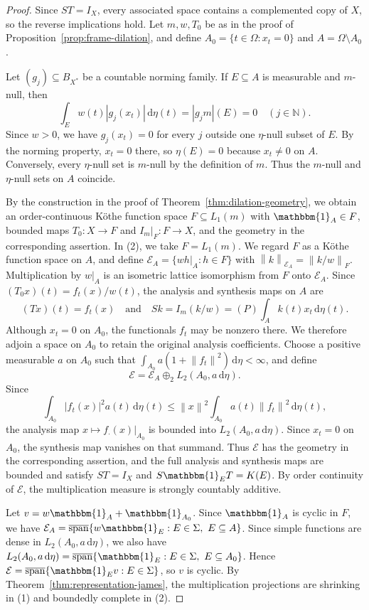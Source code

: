 \documentclass[11pt,leqno]{amsart}
\theoremstyle{compact}
\numberwithin{equation}{section}
\theoremstyle{compactremark}
\theoremstyle{compact}
\def\cspan{\overline{\operatorname{span}}}
\newcommand{\1}{\mathbbm{1}}
\newcommand{\rmd}{\mathrm{d}}
\newcommand{\N}{\mathbb{N}}
\newcommand{\norm}[1]{\left\|#1\right\|}
\newcommand{\abs}[1]{\left|#1\right|}
\begin{document}
\begin{proof}
\begingroup
Since $ST=I_X$, every associated space contains a complemented copy of $X$, so the reverse implications hold. Let $m,w,T_0$ be as in the proof of Proposition~\ref{prop:frame-dilation}, and define $A_0=\{t\in\Omega:x_t=0\}$ and $A=\Omega\setminus A_0$.

Let $(g_j)\subseteq B_{X^*}$ be a countable norming family. If $E\subseteq A$ is measurable and $m$-null, then
\[
\int_Ew(t)\abs{g_j(x_t)}\,\rmd\eta(t)=\abs{g_jm}(E)=0\quad(j\in\N).
\]
Since $w>0$, we have $g_j(x_t)=0$ for every $j$ outside one $\eta$-null subset of $E$. By the norming property, $x_t=0$ there, so $\eta(E)=0$ because $x_t\neq0$ on $A$. Conversely, every $\eta$-null set is $m$-null by the definition of $m$. Thus the $m$-null and $\eta$-null sets on $A$ coincide.

By the construction in the proof of Theorem~\ref{thm:dilation-geometry}, we obtain an order-continuous K\"othe function space $F\subseteq L_1(m)$ with $\1_A\in F$, bounded maps $T_0\colon X\to F$ and $I_m|_F\colon F\to X$, and the geometry in the corresponding assertion. In (2), we take $F=L_1(m)$. We regard $F$ as a K\"othe function space on $A$, and define $\mathcal E_A=\{wh|_A:h\in F\}$ with $\norm{k}_{\mathcal E_A}=\norm{k/w}_F$. Multiplication by $w|_A$ is an isometric lattice isomorphism from $F$ onto $\mathcal E_A$. Since $(T_0x)(t)=f_t(x)/w(t)$, the analysis and synthesis maps on $A$ are
\[
(Tx)(t)=f_t(x)\quad\text{and}\quad Sk=I_m(k/w)=(P)\!\int_Ak(t)x_t\,\rmd\eta(t).
\]
Although $x_t=0$ on $A_0$, the functionals $f_t$ may be nonzero there. We therefore adjoin a space on $A_0$ to retain the original analysis coefficients. Choose a positive measurable $a$ on $A_0$ such that $\int_{A_0}a(1+\norm{f_t}^2)\,\rmd\eta<\infty$, and define
\[
\mathcal E=\mathcal E_A\oplus_2 L_2(A_0,a\,\rmd\eta).
\]
Since
\[
\int_{A_0}\abs{f_t(x)}^2a(t)\,\rmd\eta(t)\leq\norm{x}^2\int_{A_0}a(t)\norm{f_t}^2\,\rmd\eta(t),
\]
the analysis map $x\mapsto f_\cdot(x)|_{A_0}$ is bounded into $L_2(A_0,a\,\rmd\eta)$. Since $x_t=0$ on $A_0$, the synthesis map vanishes on that summand. Thus $\mathcal E$ has the geometry in the corresponding assertion, and the full analysis and synthesis maps are bounded and satisfy $ST=I_X$ and $S\1_ET=K(E)$. By order continuity of $\mathcal E$, the multiplication measure is strongly countably additive.

Let $v=w\1_A+\1_{A_0}$. Since $\1_A$ is cyclic in $F$, we have $\mathcal E_A=\cspan\{w\1_E:E\in\Sigma,\ E\subseteq A\}$. Since simple functions are dense in $L_2(A_0,a\,\rmd\eta)$, we also have $L_2(A_0,a\,\rmd\eta)=\cspan\{\1_E:E\in\Sigma,\ E\subseteq A_0\}$. Hence $\mathcal E=\cspan\{\1_Ev:E\in\Sigma\}$, so $v$ is cyclic. By Theorem~\ref{thm:representation-james}, the multiplication projections are shrinking in (1) and boundedly complete in (2).
\endgroup
\end{proof}
\end{document}
